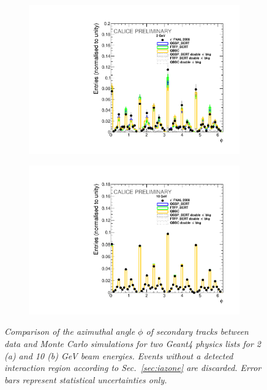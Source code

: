 \begin{figure}[H]
	\centering
	\begin{subfigure}{0.5\textwidth}
		\centering
		\includegraphics[width=.90\linewidth]{ECAL/plots/phi-2.pdf}
		\caption{\label{fig:phi2} }
	\end{subfigure}%
	\begin{subfigure}{0.5\textwidth}
		\centering
		\includegraphics[width=.90\linewidth]{ECAL/plots/phi-10.pdf}
		\caption{\label{fig:phi10} }
	\end{subfigure}
	\caption{\label{fig:phiexample} \sl Comparison of the azimuthal angle $\phi$ of secondary tracks between data and Monte Carlo simulations for two {\sc Geant}4 physics lists for 2 (a) and 10 (b) GeV beam energies. Events without a detected interaction region according to Sec.~\ref{sec:iazone} are discarded. Error bars represent statistical uncertainties only.}
\end{figure}

